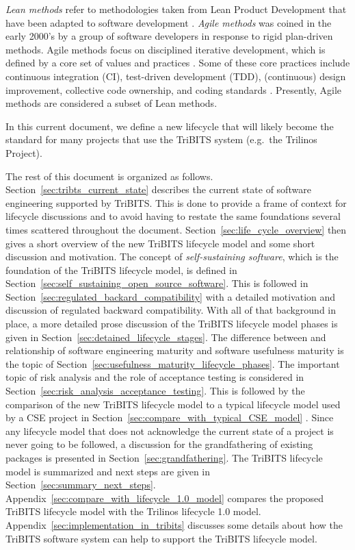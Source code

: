 \documentclass[11pt]{SANDreport}
\begin{document}
\textit{Lean methods} refer to methodologies taken
from Lean Product Development that have been adapted to software
development {}\cite{ImplementingLeanSoftwareDevelopment}.  
\textit{Agile methods} was coined in the early 2000's by a group of
software developers in response to rigid plan-driven methods.
Agile methods focus on disciplined iterative development, which is
defined by a core set of values and practices
{}\cite{AgileSoftwareDevelopment, Scrum, XP2}.  Some of these core
practices include continuous integration (CI), test-driven
development (TDD), (continuous) design improvement, collective code
ownership, and coding standards {}\cite{AgileSoftwareDevelopment,
XP2}.  Presently, Agile methods are considered a subset of Lean
methods.

In this current document, we define a new lifecycle that will likely
become the standard for many projects that use the TriBITS system
(e.g.\ the Trilinos Project).

The rest of this document is organized as follows.
Section~\ref{sec:tribts_current_state} describes the current state of
software engineering supported by TriBITS.  This is done to provide a
frame of context for lifecycle discussions and to avoid having to
restate the same foundations several times scattered throughout the
document.  Section~\ref{sec:life_cycle_overview} then gives a short
overview of the new TriBITS lifecycle model and some short discussion
and motivation.  The concept of \textit{self-sustaining software},
which is the foundation of the TriBITS lifecycle model, is defined in
Section~\ref{sec:self_sustaining_open_source_software}.  This is
followed in Section~\ref{sec:regulated_backard_compatibility} with a
detailed motivation and discussion of regulated backward
compatibility.  With all of that background in place, a more detailed
prose discussion of the TriBITS lifecycle model phases is given in
Section~\ref{sec:detained_lifecycle_stages}.  The difference between
and relationship of software engineering maturity and software
usefulness maturity is the topic of
Section~\ref{sec:usefulness_maturity_lifecycle_phases}.  The important
topic of risk analysis and the role of acceptance testing is
considered in Section~\ref{sec:risk_analysis_acceptance_testing}.
This is followed by the comparison of the new TriBITS lifecycle model
to a typical lifecycle model used by a CSE project in
Section~\ref{sec:compare_with_typical_CSE_model} .  Since any
lifecycle model that does not acknowledge the current state of a
project is never going to be followed, a discussion for the
grandfathering of existing packages is presented in
Section~\ref{sec:grandfathering}.  The TriBITS lifecycle model is
summarized and next steps are given in
Section~\ref{sec:summary_next_steps}.
Appendix~\ref{sec:compare_with_lifecycle_1.0_model} compares the
proposed TriBITS lifecycle model with the Trilinos lifecycle 1.0
model.  Appendix~\ref{sec:implementation_in_tribits} discusses some
details about how the TriBITS software system can help to support the
TriBITS lifecycle model.
\end{document}
